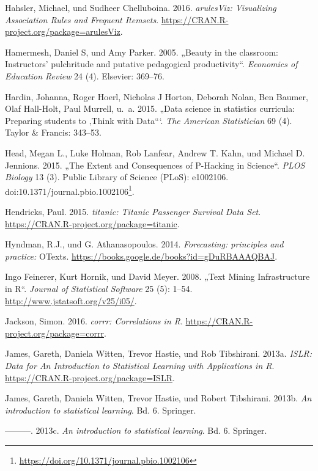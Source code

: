 \documentclass[12pt,ngerman,]{book}
\let\rmarkdownfootnote\footnote%
\def\footnote{\protect\rmarkdownfootnote}
\renewcommand{\href}[2]{#2\footnote{\url{#1}}}
\begin{document}
\hypertarget{ref-R-arulesViz}{}
Hahsler, Michael, und Sudheer Chelluboina. 2016. \emph{arulesViz:
Visualizing Association Rules and Frequent Itemsets}.
\url{https://CRAN.R-project.org/package=arulesViz}.

\hypertarget{ref-hamermesh2005beauty}{}
Hamermesh, Daniel S, und Amy Parker. 2005. „Beauty in the classroom:
Instructors' pulchritude and putative pedagogical productivity``.
\emph{Economics of Education Review} 24 (4). Elsevier: 369--76.

\hypertarget{ref-hardin2015data}{}
Hardin, Johanna, Roger Hoerl, Nicholas J Horton, Deborah Nolan, Ben
Baumer, Olaf Hall-Holt, Paul Murrell, u.~a. 2015. „Data science in
statistics curricula: Preparing students to ‚Think with Data```.
\emph{The American Statistician} 69 (4). Taylor \& Francis: 343--53.

\hypertarget{ref-Head2015}{}
Head, Megan L., Luke Holman, Rob Lanfear, Andrew T. Kahn, und Michael D.
Jennions. 2015. „The Extent and Consequences of P-Hacking in Science``.
\emph{PLOS Biology} 13 (3). Public Library of Science (PLoS): e1002106.
doi:\href{https://doi.org/10.1371/journal.pbio.1002106}{10.1371/journal.pbio.1002106}.

\hypertarget{ref-R-titanic}{}
Hendricks, Paul. 2015. \emph{titanic: Titanic Passenger Survival Data
Set}. \url{https://CRAN.R-project.org/package=titanic}.

\hypertarget{ref-hyndman2014forecasting}{}
Hyndman, R.J., und G. Athanasopoulos. 2014. \emph{Forecasting:
principles and practice:} OTexts.
\url{https://books.google.de/books?id=gDuRBAAAQBAJ}.

\hypertarget{ref-tm}{}
Ingo Feinerer, Kurt Hornik, und David Meyer. 2008. „Text Mining
Infrastructure in R``. \emph{Journal of Statistical Software} 25 (5):
1--54. \url{http://www.jstatsoft.org/v25/i05/}.

\hypertarget{ref-R-corrr}{}
Jackson, Simon. 2016. \emph{corrr: Correlations in R}.
\url{https://CRAN.R-project.org/package=corrr}.

\hypertarget{ref-R-ISLR}{}
James, Gareth, Daniela Witten, Trevor Hastie, und Rob Tibshirani. 2013a.
\emph{ISLR: Data for An Introduction to Statistical Learning with
Applications in R}. \url{https://CRAN.R-project.org/package=ISLR}.

\hypertarget{ref-introstatlearning}{}
James, Gareth, Daniela Witten, Trevor Hastie, und Robert Tibshirani.
2013b. \emph{An introduction to statistical learning}. Bd. 6. Springer.

\hypertarget{ref-james2013introduction}{}
---------. 2013c. \emph{An introduction to statistical learning}. Bd. 6.
Springer.
\end{document}
